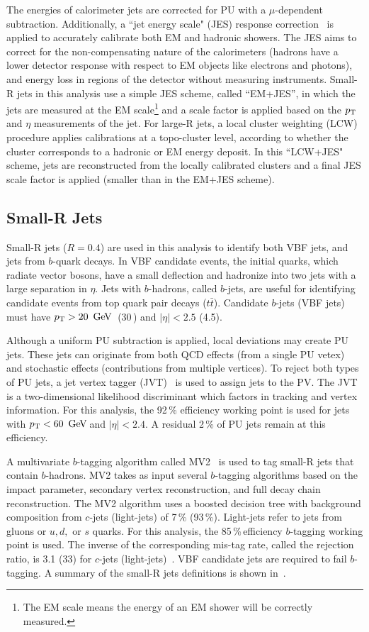 The energies of calorimeter jets are corrected for PU with a $\mu$-dependent subtraction. Additionally, a ``jet energy scale" (JES) response correction~\cite{jet_energy_measurement}  is applied to accurately calibrate both EM and hadronic showers. The JES aims to correct for the non-compensating nature of the calorimeters (hadrons have a lower detector response with respect to EM objects like electrons and photons), and energy loss in regions of the detector without measuring instruments. Small-R jets in this analysis use a simple JES scheme, called ``EM+JES'', in which the jets are measured at the EM scale\footnote{
	 The EM scale means the energy of an EM shower will be correctly measured.
} and a scale factor is applied based on the $p_{\text{T}}$ and $\eta$ measurements of the jet. For large-R jets, a local cluster weighting (LCW) procedure applies calibrations at a topo-cluster level, according to whether the cluster corresponds to a hadronic or EM energy deposit.  In this ``LCW+JES" scheme, jets are reconstructed from the locally calibrated clusters and a final JES scale factor is applied (smaller than in the EM+JES scheme). 
%
\subsection{Small-R Jets}
\label{ch:objectReconstruction:smallr}
Small-R jets ($R=0.4$) are used in this analysis to identify both VBF jets, and jets from $b$-quark decays. In VBF candidate events, the initial quarks, which radiate vector bosons, have a small deflection and hadronize into two jets with a large separation in $\eta$. Jets with $b$-hadrons, called $b$-jets, are useful for identifying candidate events from top quark pair decays ($t\bar{t}$). Candidate $b$-jets (VBF jets) must have $\pT>20\,\GeV$\, (30\,\GeV) and $|\eta| < 2.5$ (4.5).

Although a uniform PU subtraction is applied, local deviations may create PU jets. These jets can originate from both QCD effects (from a single PU vetex) and stochastic effects (contributions from multiple vertices). To reject both types of PU jets, a jet vertex tagger (JVT)~\cite{jvt} is used to assign jets to the PV. The JVT is a two-dimensional likelihood discriminant which factors in tracking and vertex information. For this analysis, the 92\,\% efficiency working point is used for jets with $\pT<60\,\GeV$\,and $|\eta|<2.4$. A residual 2\,\% of PU jets remain at this efficiency.

A multivariate $b$-tagging algorithm called MV2~\cite{b_jet} is used to tag small-R jets that contain $b$-hadrons. MV2 takes as input several $b$-tagging algorithms based on the impact parameter, secondary vertex reconstruction, and full decay chain reconstruction. The MV2 algorithm uses a boosted decision tree with background composition from $c$-jets (light-jets) of 7\,\% (93\,\%). Light-jets refer to jets from gluons or $u, d,$ or $s$ quarks. For this analysis, the 85\,\%\,efficiency $b$-tagging working point is used. The inverse of the corresponding mis-tag rate, called the rejection ratio, is 3.1 (33) for $c$-jets (light-jets)~\cite{b_jet_opt}. VBF candidate jets are required to fail $b$-tagging. A summary of the small-R jets definitions is shown in~\Tab{\ref{tab:small_j_def}}.

